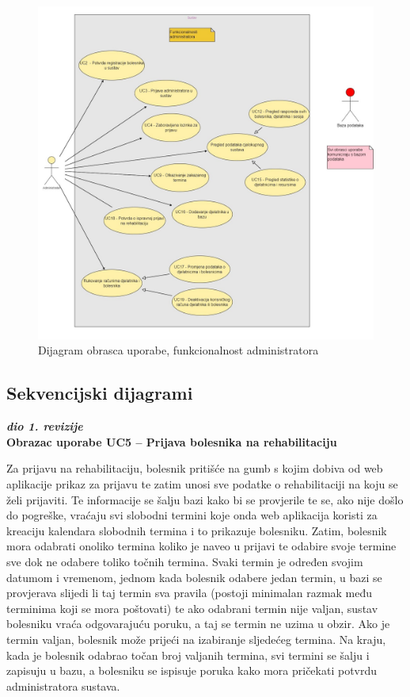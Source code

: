 \begin{figure}[bp]
    \centering
    \includegraphics[width=\textwidth]{./slike/UC Dijagram - Administrator} 
    \caption{Dijagram obrasca uporabe, funkcionalnost administratora}
    \label{fig:my_image}
\end{figure}
\eject

\subsection{Sekvencijski dijagrami}

\textbf{\textit{dio 1. revizije}}\\



\textbf{Obrazac uporabe UC5 – Prijava bolesnika na rehabilitaciju}

Za prijavu na rehabilitaciju, bolesnik pritišće na gumb s kojim dobiva od web aplikacije prikaz za prijavu te zatim unosi sve podatke o rehabilitaciji na koju se želi prijaviti. Te informacije se šalju bazi kako bi se provjerile te se, ako nije došlo do pogreške, vraćaju svi slobodni termini koje onda web aplikacija koristi za kreaciju kalendara slobodnih termina i to prikazuje bolesniku. Zatim, bolesnik mora odabrati onoliko termina koliko je naveo u prijavi te odabire svoje termine sve dok ne odabere toliko točnih termina. Svaki termin je određen svojim datumom i vremenom, jednom kada bolesnik odabere jedan termin, u bazi se provjerava slijedi li taj termin sva pravila (postoji minimalan razmak među terminima koji se mora poštovati) te ako odabrani termin nije valjan, sustav bolesniku vraća odgovarajuću poruku, a taj se termin ne uzima u obzir. Ako je termin valjan, bolesnik može prijeći na izabiranje sljedećeg termina. Na kraju, kada je bolesnik odabrao točan broj valjanih termina, svi termini se šalju i zapisuju u bazu, a bolesniku se ispisuje poruka kako mora pričekati potvrdu administratora sustava.

